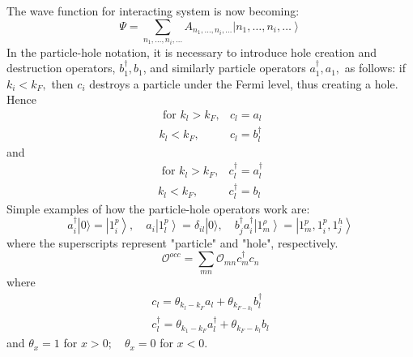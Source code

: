 The wave function for interacting system is now becoming:
\begin{equation}\Psi=\sum_{n_{1}, \ldots, n_{i}, \ldots} A_{n_{1}, \ldots, n_{i}, \ldots}\left|n_{1}, \ldots, n_{i}, \ldots\right\rangle\end{equation}
In the particle-hole notation, it is necessary to introduce hole creation and destruction operators, $b_1^{\dagger}, b_{1}$, and similarly particle operators $a_1^{\dagger}, a_{1},$ as follows:
if $k_{i}<k_{F},$ then $c_{i}$ destroys a particle under the Fermi level, thus creating a hole. Hence
\begin{equation}\begin{aligned}
\text { for } k_{l}>k_{F}, & c_{l}=a_{l} \\
k_{l}<k_{F}, & c_{l}=b^{\dagger}_l
\end{aligned}\end{equation}
and
\begin{equation}\begin{aligned}
\text { for } k_{l}>k_{F}, & c_{l}^{\dagger}=a_{l}^{\dagger} \\
k_{l}<k_{F}, & c_{l}^{\dagger}=b_{l}
\end{aligned}\end{equation}
Simple examples of how the particle-hole operators work are:
$$a_{i}^{\dagger}|0\rangle=\left|1_i^{p}\right\rangle, \quad a_{i}\left|1_l^{p}\right\rangle=\delta_{il}|0\rangle, \quad b_{j}^{\dagger} a_{i}^{\dagger}\left|1_{m}^{\rho}\right\rangle=\left|1_{m}^{p}, 1_i^{p}, 1_j^{h}\right\rangle$$
where the superscripts represent "particle" and "hole", respectively. 
\begin{equation}\mathcal{O}^{occ}=\sum_{m n} \mathcal{O}_{m n} c_{m}^{\dagger} c_{n}\end{equation}
where
\begin{equation}\begin{array}{l}
c_{l}=\theta_{k_{l}-k_{F}} a_{l}+\theta_{k_{F-k_{l}}} b_{l}^{\dagger} \\
c_{l}^{\dagger}=\theta_{k_{1}-k_{F}} a_{l}^{\dagger}+\theta_{k_{F}-k_{l}} b_{l}
\end{array}\end{equation}
and $\theta_{x}=1$ for $x>0 ; \quad \theta_{x}=0$ for $x<0$.

